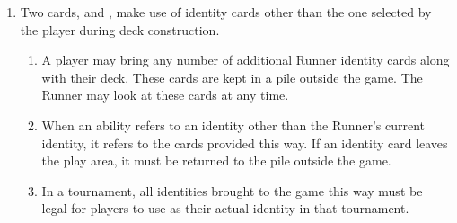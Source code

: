 \begin{enumerate}
	\item Two cards,  and , make use of identity cards other than the one selected by the player during deck construction.
	      \begin{enumerate}
		      \item A player may bring any number of additional Runner identity cards along with their deck. These cards are kept in a pile outside the game. The Runner may look at these cards at any time.
		      \item When an ability refers to an identity other than the Runner's current identity, it refers to the cards provided this way. If an identity card leaves the play area, it must be
		            returned to the pile outside the game.
		      \item In a tournament, all identities brought to the game this way must be legal for players to use as their actual identity in that tournament.
	      \end{enumerate}
\end{enumerate}
\clearpage
